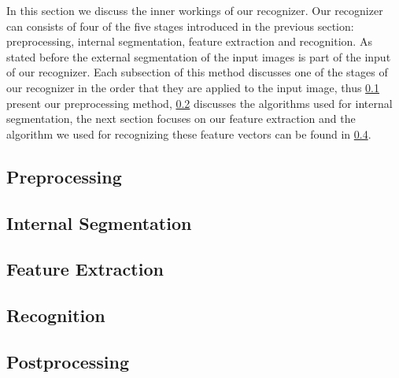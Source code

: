 In this section we discuss the inner workings of our recognizer. Our recognizer can consists of four of the five stages introduced in the previous section: preprocessing, internal segmentation, feature extraction and recognition. As stated before the external segmentation of the input images is part of the input of our recognizer. Each subsection of this method discusses one of the stages of our recognizer in the order that they are applied to the input image, thus \cref{ss:methods:preprocessing} present our preprocessing method, \cref{ss:methods:characterSegmentation} discusses the algorithms used for internal segmentation, the next section focuses on our feature extraction and the algorithm we used for recognizing these feature vectors can be found in \cref{ss:methods:machineLearing}.

\subsection{Preprocessing}
\label{ss:methods:preprocessing}


\subsection{Internal Segmentation}
\label{ss:methods:characterSegmentation}


\subsection{Feature Extraction}
\label{ss:methods:featureExtraction}


\subsection{Recognition}
\label{ss:methods:machineLearing}


\subsection{Postprocessing}
\label{ss:methods:postprocessing}
